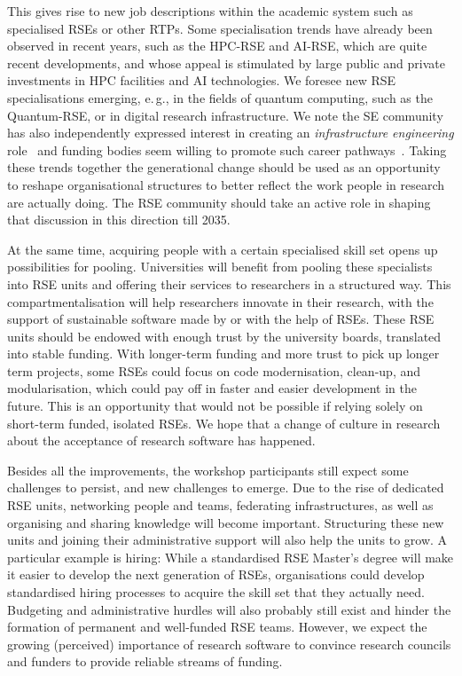 \documentclass{eceasst}
\newcommand{\eg}{e.\,g.}
\begin{document}
This gives rise to new job descriptions within the academic system such as specialised RSEs or other RTPs.
Some specialisation trends have already been observed in recent years,
such as the HPC-RSE and AI-RSE, which are quite recent developments,
and whose appeal is stimulated by large public and private investments in HPC facilities and AI technologies.
We foresee new RSE specialisations emerging, \eg, in the fields of quantum computing,
such as the Quantum-RSE, or in digital research infrastructure.
We note the SE community has also independently expressed interest in creating an \emph{infrastructure engineering} role~\cite{Sochat2024Infra}
and funding bodies seem willing to promote such career pathways~\cite{UKRI2025Infra,EuroHPC2024Federated}.
Taking these trends together the generational change should be used as an opportunity to reshape organisational structures to better reflect the work people in research
are actually doing. The RSE community should take an active role in shaping that discussion in this direction till 2035.

At the same time, acquiring people with a certain specialised skill set
opens up possibilities for pooling.
Universities will benefit from pooling these specialists into RSE units
and offering their services to researchers in a structured way.
This compartmentalisation will help researchers innovate in their research,
with the support of sustainable software made by or with the help of RSEs.
These RSE units should be endowed with enough trust by the university boards, translated into stable funding.
With longer-term funding and more trust to pick up longer term projects,
some RSEs could focus on code modernisation, clean-up, and modularisation,
which could pay off in faster and easier development in the future.
This is an opportunity that would not be possible if relying solely on short-term funded, isolated RSEs.
We hope that a change of culture in research about the acceptance of research software has happened.

Besides all the improvements, the workshop participants still expect some challenges to persist,
and new challenges to emerge.
Due to the rise of dedicated RSE units, networking people and teams,
federating infrastructures, as well as organising and sharing knowledge will become important.
Structuring these new units and joining their administrative support will also help the units to grow.
A particular example is hiring:
While a standardised RSE Master's degree will make it easier to develop the next generation of RSEs,
organisations could develop standardised hiring processes to acquire the skill set that they actually need.
Budgeting and administrative hurdles will also probably still exist and hinder the formation of permanent and well-funded RSE teams.
However, we expect the growing (perceived) importance of research software
to convince research councils and funders to provide reliable streams of funding.
\end{document}
